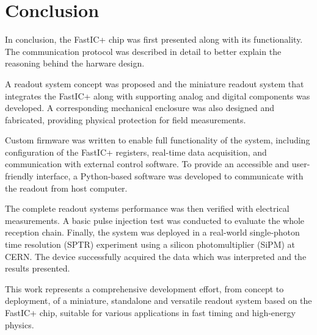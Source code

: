 \documentclass[twoside]{ctuthesis}
\theoremstyle{plain}
\theoremstyle{definition}
\theoremstyle{note}
\begin{document}
\chapter{Conclusion}
In conclusion, the FastIC+ chip was first presented along with its functionality. The communication protocol was described in detail to better explain the reasoning behind the harware design.

A readout system concept was proposed and the miniature readout system that integrates the FastIC+ along with supporting analog and digital components was developed. A corresponding mechanical enclosure was also designed and fabricated, providing physical protection for field measurements.

Custom firmware was written to enable full functionality of the system, including configuration of the FastIC+ registers, real-time data acquisition, and communication with external control software. To provide an accessible and user-friendly interface, a Python-based software was developed to communicate with the readout from host computer.

The complete readout systems performance was then verified with electrical measurements. A basic pulse injection test was conducted to evaluate the whole reception chain. Finally, the system was deployed in a real-world single-photon time resolution (SPTR) experiment using a silicon photomultiplier (SiPM) at CERN. The device successfully acquired the data which was interpreted and the results presented.

This work represents a comprehensive development effort, from concept to deployment, of a miniature, standalone and versatile readout system based on the FastIC+ chip, suitable for various applications in fast timing and high-energy physics. 

\clearpage
\FloatBarrier
\printbibliography
\newpage
\end{document}
